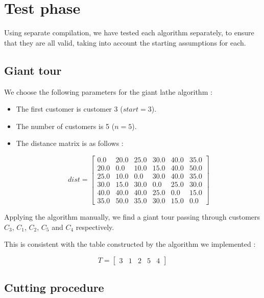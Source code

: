 \chapter{Test phase}

Using separate compilation, we have tested each algorithm separately, to ensure that they are all valid, taking into account the starting assumptions for each.

\section{Giant tour}

We choose the following parameters for the giant lathe algorithm :

\begin{itemize}
\item The first customer is customer 3 ($start = 3$).
\item The number of customers is 5 ($n=5$).
\item The distance matrix is as follows :

\begin{displaymath}
dist = \begin{bmatrix}
0.0	& 20.0	 & 25.0 	& 30.0 	& 40.0 	& 35.0 \\
20.0	& 0.0 	 & 10.0 	& 15.0 	& 40.0 	& 50.0 \\
25.0	& 10.0	 & 0.0 	& 30.0 	& 40.0 	& 35.0 \\
30.0	& 15.0	 & 30.0 	& 0.0 	& 25.0 	& 30.0 \\
40.0	& 40.0	 & 40.0 	& 25.0 	& 0.0 	& 15.0 \\
35.0	& 50.0	 & 35.0	& 30.0 	& 15.0 	& 0.0
\end{bmatrix}
\end{displaymath}
\end{itemize}

Applying the algorithm manually, we find a giant tour passing through customers $C_3$, $C_1$, $C_2$, $C_5$ and $C_4$ respectively.

This is consistent with the table constructed by the algorithm we implemented :

\begin{displaymath}
T = \begin{bmatrix}
3 & 1 & 2 & 5 & 4
\end{bmatrix}
\end{displaymath}

\section{Cutting procedure}

